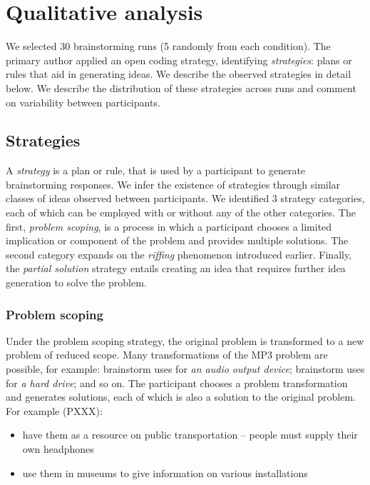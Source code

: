 \section{Qualitative analysis}


We selected 30 brainstorming runs (5 randomly from each condition). The primary author applied an open coding strategy, identifying \emph{strategies}: plans or rules that aid in generating ideas. We describe the observed strategies in detail below.
We describe the distribution of these strategies across runs and comment on variability between participants.

\subsection{Strategies}

A \emph{strategy} is a plan or rule, that is used by a participant to generate brainstorming responses. We infer the existence of strategies through similar classes of ideas observed between participants.
We identified 3 strategy categories, each of which can be employed with or without any of the other categories.
The first, \emph{problem scoping}, is a process in which a participant chooses a limited implication or component of the problem and provides multiple solutions.
The second category expands on the \emph{riffing} phenomenon introduced earlier.
Finally, the \emph{partial solution} strategy entails creating an idea that requires further idea generation to solve the problem.

\subsubsection{Problem scoping}

Under the problem scoping strategy, the original problem is transformed to a new problem of reduced scope.
Many transformations of the MP3 problem are possible, for example: brainstorm uses for \emph{an audio output device}; brainstorm uses for \emph{a hard drive}; and so on. The participant chooses a problem transformation and generates solutions, each of which is also a solution to the original problem. For example (PXXX):

\begin{itemize}
    \item have them as a resource on public transportation -- people must supply their own headphones
    \item use them in museums to give information on various installations
\end{itemize}

